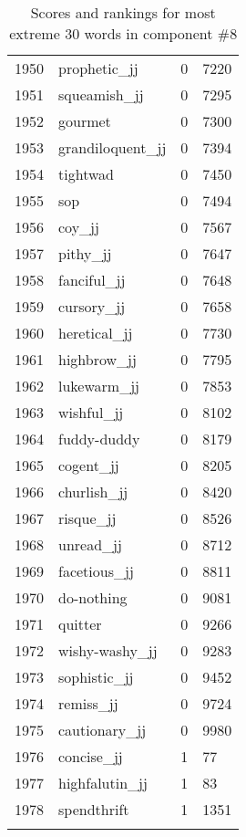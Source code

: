 \begin{longtable}[!htbp]{| rlr@{.}l |}
    1950 & prophetic\_jj & 0 & 7220 \\
    1951 & squeamish\_jj & 0 & 7295 \\
    1952 & gourmet & 0 & 7300 \\
    1953 & grandiloquent\_jj & 0 & 7394 \\
    1954 & tightwad & 0 & 7450 \\
    1955 & sop & 0 & 7494 \\
    1956 & coy\_jj & 0 & 7567 \\
    1957 & pithy\_jj & 0 & 7647 \\
    1958 & fanciful\_jj & 0 & 7648 \\
    1959 & cursory\_jj & 0 & 7658 \\
    1960 & heretical\_jj & 0 & 7730 \\
    1961 & highbrow\_jj & 0 & 7795 \\
    1962 & lukewarm\_jj & 0 & 7853 \\
    1963 & wishful\_jj & 0 & 8102 \\
    1964 & fuddy-duddy & 0 & 8179 \\
    1965 & cogent\_jj & 0 & 8205 \\
    1966 & churlish\_jj & 0 & 8420 \\
    1967 & risque\_jj & 0 & 8526 \\
    1968 & unread\_jj & 0 & 8712 \\
    1969 & facetious\_jj & 0 & 8811 \\
    1970 & do-nothing & 0 & 9081 \\
    1971 & quitter & 0 & 9266 \\
    1972 & wishy-washy\_jj & 0 & 9283 \\
    1973 & sophistic\_jj & 0 & 9452 \\
    1974 & remiss\_jj & 0 & 9724 \\
    1975 & cautionary\_jj & 0 & 9980 \\
    1976 & concise\_jj & 1 & 77 \\
    1977 & highfalutin\_jj & 1 & 83 \\
    1978 & spendthrift & 1 & 1351 \\
    \hline
    \caption{Scores and rankings for most extreme 30 words in component \#8} \\
\end{longtable}

